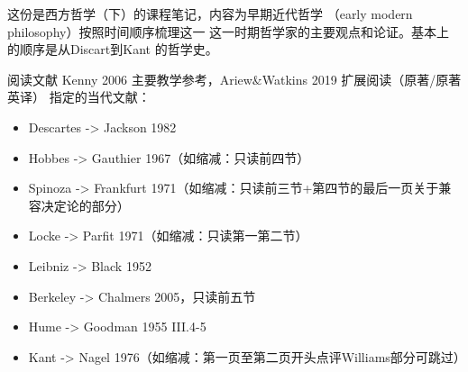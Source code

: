 \documentclass{ctexart}
\begin{document}
这份是西方哲学（下）的课程笔记，内容为早期近代哲学
（early modern philosophy）按照时间顺序梳理这一
这一时期哲学家的主要观点和论证。基本上的顺序是从Discart到Kant
的哲学史。

\begin{fancybox}{阅读文献}
Kenny 2006 主要教学参考，Ariew\&Watkins 2019 扩展阅读（原著/原著英译）
指定的当代文献：
\begin{itemize}
    \item Descartes -> Jackson 1982
    \item Hobbes -> Gauthier 1967（如缩减：只读前四节）
    \item Spinoza -> Frankfurt 1971（如缩减：只读前三节+第四节的最后一页关于兼容决定论的部分）
    \item Locke -> Parfit 1971（如缩减：只读第一第二节）
    \item Leibniz -> Black 1952
    \item Berkeley -> Chalmers 2005，只读前五节
    \item Hume -> Goodman 1955 III.4-5
    \item Kant -> Nagel 1976（如缩减：第一页至第二页开头点评Williams部分可跳过）
\end{itemize}
\end{fancybox}








\end{document}
